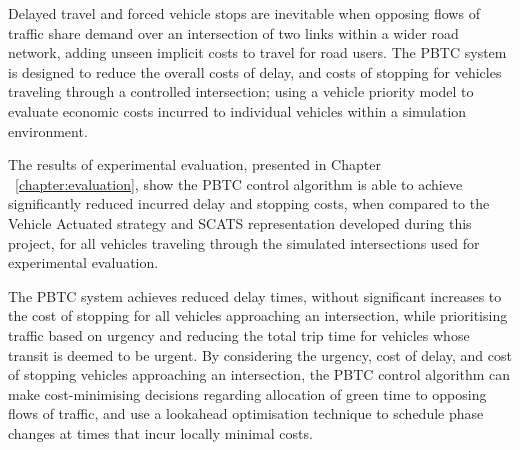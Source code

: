 Delayed travel and forced vehicle stops are inevitable when opposing flows of traffic share demand over an intersection of two links within a wider road network, adding unseen implicit costs to travel for road users. The PBTC system is designed to reduce the overall costs of delay, and costs of stopping for vehicles traveling through a controlled intersection; using a vehicle priority model to evaluate economic costs incurred to individual vehicles within a simulation environment.

The results of experimental evaluation, presented in Chapter ~\ref{chapter:evaluation}, show the PBTC control algorithm is able to achieve significantly reduced incurred delay and stopping costs, when compared to the Vehicle Actuated strategy and SCATS representation developed during this project, for all vehicles traveling through the simulated intersections used for experimental evaluation. 

The PBTC system achieves reduced delay times, without significant increases to the cost of stopping for all vehicles approaching an intersection, while prioritising traffic based on urgency and reducing the total trip time for vehicles whose transit is deemed to be urgent. By considering the urgency, cost of delay, and cost of stopping vehicles approaching an intersection, the PBTC control algorithm can make cost-minimising decisions regarding allocation of green time to opposing flows of traffic, and use a lookahead optimisation technique to schedule phase changes at times that incur locally minimal costs.







